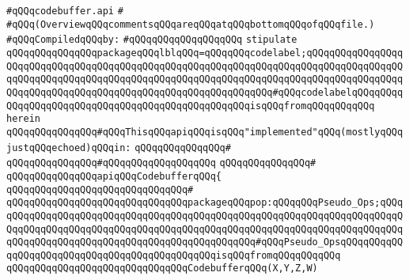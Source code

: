 \label{src/lib/compiler/back/low/code/codebuffer.api}
\verb|#qQQqcodebuffer.api|\newline
\verb|#|\newline
\verb|#qQQq(OverviewqQQqcommentsqQQqareqQQqatqQQqbottomqQQqofqQQqfile.)|\newline
\newline
\verb|#qQQqCompiledqQQqby:|\newline
\verb|#qQQqqQQqqQQqqQQqqQQq|\newline
\newline
\verb|stipulate|\newline
\verb|qQQqqQQqqQQqqQQqpackageqQQqlblqQQq=qQQqqQQqcodelabel;qQQqqQQqqQQqqQQqqQQqqQQqqQQqqQQqqQQqqQQqqQQqqQQqqQQqqQQqqQQqqQQqqQQqqQQqqQQqqQQqqQQqqQQqqQQqqQQqqQQqqQQqqQQqqQQqqQQqqQQqqQQqqQQqqQQqqQQqqQQqqQQqqQQqqQQqqQQqqQQqqQQqqQQqqQQqqQQqqQQqqQQqqQQqqQQqqQQqqQQqqQQq#qQQqcodelabelqQQqqQQqqQQqqQQqqQQqqQQqqQQqqQQqqQQqqQQqqQQqqQQqqQQqisqQQqfromqQQqqQQqqQQq|\newline
\verb|herein|\newline
\newline
\verb|qQQqqQQqqQQqqQQq#qQQqThisqQQqapiqQQqisqQQq"implemented"qQQq(mostlyqQQqjustqQQqechoed)qQQqin:|\newline
\verb|qQQqqQQqqQQqqQQq#|\newline
\verb|qQQqqQQqqQQqqQQq#qQQqqQQqqQQqqQQqqQQq|\newline
\verb|qQQqqQQqqQQqqQQq#|\newline
\verb|qQQqqQQqqQQqqQQqapiqQQqCodebufferqQQq{|\newline
\verb|qQQqqQQqqQQqqQQqqQQqqQQqqQQqqQQq#|\newline
\verb|qQQqqQQqqQQqqQQqqQQqqQQqqQQqqQQqpackageqQQqpop:qQQqqQQqPseudo_Ops;qQQqqQQqqQQqqQQqqQQqqQQqqQQqqQQqqQQqqQQqqQQqqQQqqQQqqQQqqQQqqQQqqQQqqQQqqQQqqQQqqQQqqQQqqQQqqQQqqQQqqQQqqQQqqQQqqQQqqQQqqQQqqQQqqQQqqQQqqQQqqQQqqQQqqQQqqQQqqQQqqQQqqQQqqQQqqQQqqQQqqQQqqQQq#qQQqPseudo_OpsqQQqqQQqqQQqqQQqqQQqqQQqqQQqqQQqqQQqqQQqqQQqqQQqisqQQqfromqQQqqQQqqQQq|\newline
\newline
\verb|qQQqqQQqqQQqqQQqqQQqqQQqqQQqqQQqCodebufferqQQq(X,Y,Z,W)|\newline
